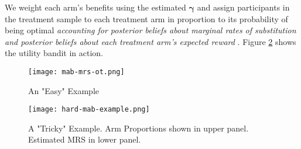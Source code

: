 \documentclass{article}
\begin{document}
We weight each arm's benefits using the estimated $\bm{\gamma}$ and 
assign participants in the treatment sample to each treatment arm in proportion to its probability of being optimal \textit{
    accounting for posterior beliefs about marginal rates of substitution and 
    posterior beliefs about each treatment arm's expected reward
}. Figure \ref{fig:mab} shows the utility bandit in action.

\begin{figure}[htbp]
    \centering
    \texttt{[image: mab-mrs-ot.png]} 
    \label{fig:mab}
    \caption{An "Easy" Example}
\end{figure}

\begin{figure}[htbp]
    \centering
    \texttt{[image: hard-mab-example.png]} 
    \label{fig:mab}
    \caption{A "Tricky" Example.
     Arm Proportions shown in upper panel. Estimated MRS in lower panel.}
\end{figure}
\end{document}
